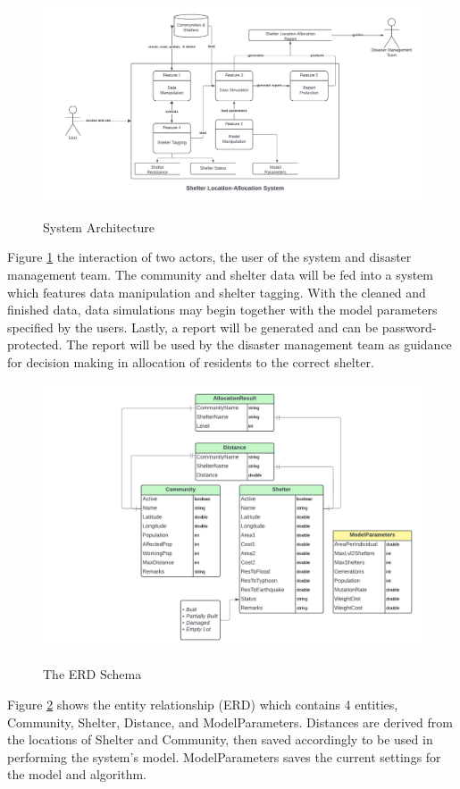 \documentclass[12pt,a4paper,]{article}
\begin{document}
	\begin{figure}[h!]
		\caption{System Architecture}
		\centering
		\includegraphics[width=\columnwidth]{Context Diagram}
		\label{SystemArch}
	\end{figure}
	Figure \ref{SystemArch} the interaction of two actors, the user of the system and disaster management team. The community and shelter data will be fed into a system which features data manipulation and shelter tagging. With the cleaned and finished data, data simulations may begin together with the model parameters specified by the users. Lastly, a report will be generated and can be password-protected. The report will be used by the disaster management team as guidance for decision making in allocation of residents to the correct shelter.
	
	\begin{figure}[h!]
		\caption{The ERD Schema}
		\centering
		\includegraphics[width=\columnwidth]{ERD}
		\label{ERD}
	\end{figure}
	Figure \ref{ERD} shows the entity relationship (ERD) which contains 4 entities, Community, Shelter, Distance, and ModelParameters. Distances are derived from the locations of Shelter and Community, then saved accordingly to be used in performing the system’s model. ModelParameters saves the current settings for the model and algorithm.
	
\end{document}

